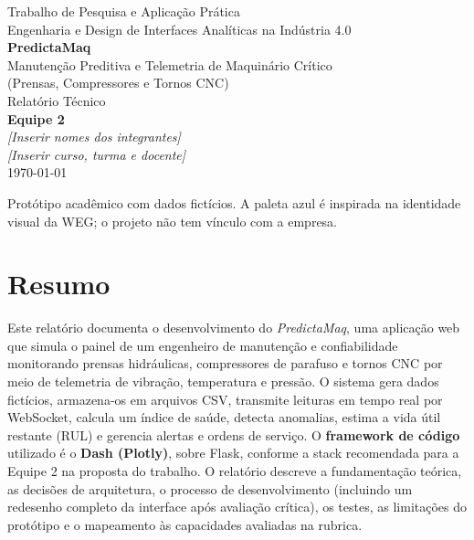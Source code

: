 \documentclass[12pt,a4paper]{article}
\begin{document}
\begin{titlepage}
\centering
\vspace*{1.5cm}
{\large Trabalho de Pesquisa e Aplicação Prática}\\[0.3cm]
{\large Engenharia e Design de Interfaces Analíticas na Indústria 4.0}\\[2.2cm]
{\Huge\bfseries\color{wegblue} PredictaMaq}\\[0.5cm]
{\Large Manutenção Preditiva e Telemetria de Maquinário Crítico\\(Prensas, Compressores e Tornos CNC)}\\[1.5cm]
{\large Relatório Técnico}\\[3cm]
\textbf{Equipe 2}\\[0.2cm]
\textit{[Inserir nomes dos integrantes]}\\[0.2cm]
\textit{[Inserir curso, turma e docente]}\\[2cm]
\today

\vfill
{\footnotesize Protótipo acadêmico com dados fictícios. A paleta azul é inspirada na identidade visual da WEG; o projeto não tem vínculo com a empresa.}
\end{titlepage}

\tableofcontents
\newpage

\section*{Resumo}
Este relatório documenta o desenvolvimento do \emph{PredictaMaq}, uma aplicação web que simula o painel de um engenheiro de manutenção
e confiabilidade monitorando prensas hidráulicas, compressores de parafuso e tornos CNC por meio de telemetria de vibração, temperatura e
pressão. O sistema gera dados fictícios, armazena-os em arquivos CSV, transmite leituras em tempo real por WebSocket, calcula um índice de
saúde, detecta anomalias, estima a vida útil restante (RUL) e gerencia alertas e ordens de serviço. O \textbf{framework de código} utilizado é o
\textbf{Dash (Plotly)}, sobre Flask, conforme a stack recomendada para a Equipe 2 na proposta do trabalho. O relatório descreve a fundamentação
teórica, as decisões de arquitetura, o processo de desenvolvimento (incluindo um redesenho completo da interface após avaliação crítica), os testes,
as limitações do protótipo e o mapeamento às capacidades avaliadas na rubrica.
\end{document}
